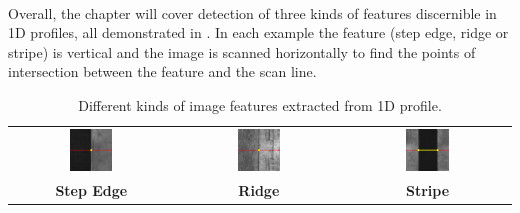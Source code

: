 \paragraph*{}
Overall, the chapter will cover detection of three kinds of features discernible in 1D profiles, all demonstrated in . In each example the feature (step edge, ridge or stripe) is vertical and the image is scanned horizontally to find the points of intersection between the feature and the scan line.

\begin{table}[h]
\centering
\begin{tabular}{c c c}
\includegraphics[width=0.275\textwidth]{img/1DEdgeDetection/edge}
& 
\includegraphics[width=0.275\textwidth]{img/1DEdgeDetection/ridge}
&
\includegraphics[width=0.275\textwidth]{img/1DEdgeDetection/stripe}
\\
\textbf{Step Edge} &
\textbf{Ridge} &
\textbf{Stripe} 
\end{tabular}
\caption{Different kinds of image features extracted from 1D profile.}
\label{tab:1DFeatures}
\end{table}